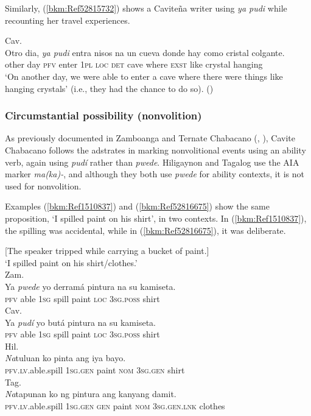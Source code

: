 \documentclass[output=paper,colorlinks,citecolor=brown]{langscibook}
\begin{document}
Similarly, (\ref{bkm:Ref52815732}) shows a Caviteña writer using \textit{ya pudi} while recounting her travel experiences.

\ea
{\label{bkm:Ref52815732}Cav.}\\
\gll Otro dia, \textit{ya pudi} entra nisos na un cueva donde hay como cristal colgante.\\
other day \textsc{pfv} enter 1\textsc{pl} \textsc{loc} \textsc{det} cave where \textsc{exst} like crystal hanging\\
\glt ‘On another day, we were able to enter a cave where there were things like hanging crystals' (i.e., they had the chance to do so). (\citealt{delRosario2007})
\z


\subsubsection{Circumstantial possibility (nonvolition)}


As previously documented in Zamboanga and Ternate Chabacano (\citealt{Rubino2008}, \citealt{Sippola2011}), Cavite Chabacano follows the adstrates in marking nonvolitional events using an ability verb, again using \textit{pudí} rather than \textit{pwede}. Hiligaynon and Tagalog use the AIA marker \textit{ma(ka)-}, and although they both use \textit{pwede} for ability contexts, it is not used for nonvolition.

Examples (\ref{bkm:Ref1510837}) and (\ref{bkm:Ref52816675}) show the same proposition, ‘I spilled paint on his shirt’, in two contexts. In (\ref{bkm:Ref1510837}), the spilling was accidental, while in (\ref{bkm:Ref52816675}), it was deliberate. 

\ea
\label{bkm:Ref1510837}[The speaker tripped while carrying a bucket of paint.] \\
{‘I spilled paint on his shirt/clothes.’}\\
\ea
{Zam.}\\
\gll Ya \textit{pwede} yo derramá pintura na su kamiseta.\\
     \textsc{pfv} able 1\textsc{sg} spill paint \textsc{loc} 3\textsc{sg.poss} shirt\\
\ex
{Cav.}\\
\gll Ya \textit{pudí} yo butá pintura na su kamiseta.\\
     \textsc{pfv} able 1\textsc{sg} spill paint \textsc{loc} 3\textsc{sg.poss} shirt\\
\ex
{Hil.}\\
\gll \textit{Na}tuluan ko pinta ang iya bayo.\\
     \textsc{pfv}.\textsc{lv}.able.spill \textsc{1sg.gen} paint \textsc{nom} 3\textsc{sg.gen} shirt\\
\ex
{Tag.}\\
\gll \textit{Na}tapunan ko ng pintura ang kanyang damit.\\
     \textsc{pfv}.\textsc{lv}.able.spill \textsc{1sg.gen} \textsc{gen} paint \textsc{nom} 3\textsc{sg.gen.lnk} clothes\\
\z
\z
\end{document}

